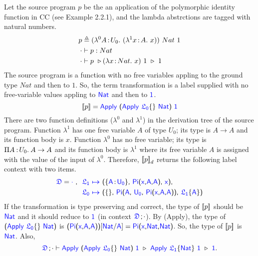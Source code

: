 \begin{exmp}Let the source program $p$ be the an application of the polymorphic identity function in CC (see Example 2.2.1), and the lambda abstrctions are tagged with natural numbers.
\begin{align*}
	p &\triangleq (\lami{0}{A}{U_0}{(\lami{1}{x}{A}{x})})\ Nat\ 1\\
	\cdot &\vdash p \mathrel{:} Nat\\
	\cdot &\vdash p\ \triangleright (\lam{x}{Nat}{x})\ 1\ \triangleright\ 1
\end{align*}
The source program is a function with no free variables appling to the ground type $Nat$ and then to $1$. So, the term transformation is a label supplied with no free-variable values appling to $\target{Nat}$ and then to $\target{1}$.
\begin{equation*}
	\bbracket{p} = 
	\target{Apply}\ \sfpl \target{Apply}\ \targetlab{\flabel_0}{}\ \target{Nat} \sfpr \ \target{1}
\end{equation*}
There are two function definitions ($\lambda^0$ and $\lambda^1$) in the derivation tree of the source program. 
Function $\lambda^1$ has one free variable $A$ of type $U_0$; its type is $A \rightarrow A$ and its function body is $x$. 
Function $\lambda^0$ has no free variable; its type is $\Pi A\mkern1.5mu{\hspace{0.5mm}{:}\hspace{0.5mm}} U_0.\hspace{0.8mm}A \rightarrow A$ and its function body is $\lambda^1$ where its free variable $A$ is assigned with the value of the input of $\lambda^0$. Therefore, ${[\![ p ]\!]}_d$ returns the following label context with two items.
\begin{align*}
	\target{\fdef} = \target{\cdot}\ \sfcomma\ &\itemdef{\target{\flabel_1}}{\itemtype{A}{U_0}}{\targetpi{x}{A}{A}}{\target{x}}\sfcomma\\
	& \itemdef{\target{\flabel_0}}{}
	{\target{Pi}\textsf{(}\target{A}\sfcomma \target{U_0}\sfcomma \targetpi{x}{A}{A}\textsf{)}}
	{\targetlab{\flabel_1}{A}}
\end{align*}
If the transformation is type preserving and correct, the type of ${[\![ p ]\!]}$ should be $\target{Nat}$ and it should reduce to $\target{1}$ (in context $\target{\fdef} \semicolon \cdot$).
By (Apply), the type of $\sfpl \target{Apply}\ \targetlab{\flabel_0}{}\ \target{Nat} \sfpr$ is $\sfpl \targetpi{x}{A}{A} \sfpr \targetsub{Nat}{A} = \targetpi{x}{Nat}{Nat}$. So, the type of ${[\![ p ]\!]}$ is $\target{Nat}$. Also,
\begin{equation*}
	\target{\fdef} \semicolon \cdot \vdash
	\target{Apply}\ \sfpl \target{Apply}\ \targetlab{\flabel_0}{}\ \target{Nat} \sfpr \ \target{1}\ \triangleright\ 
	\target{Apply}\ \targetlab{\flabel_1}{Nat}\ \target{1}\ \triangleright\ 
	\target{1}.
\end{equation*}
\end{exmp}



